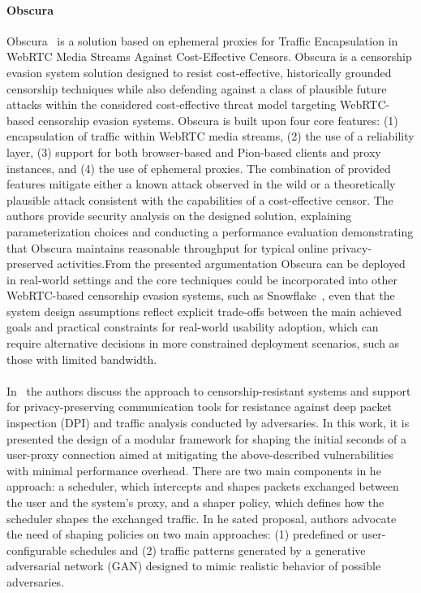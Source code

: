 \paragraph{Obscura} Obscura~\cite{OBSCURA} is a solution based on ephemeral proxies for Traffic Encapsulation in WebRTC Media Streams Against Cost-Effective Censors. Obscura is a censorship evasion system solution designed to resist cost-effective, historically grounded censorship techniques while also defending against a class of plausible future attacks within the considered cost-effective threat model targeting WebRTC-based censorship evasion systems. Obscura is built upon four core features: (1) encapsulation of traffic within WebRTC media streams, (2) the use of a reliability layer, (3) support for both browser-based and Pion-based clients and proxy instances, and (4) the use of ephemeral proxies. The combination of provided features mitigate either a known attack observed in the wild or a theoretically plausible attack consistent with the capabilities of a cost-effective censor. The authors provide security analysis on the designed solution, explaining parameterization choices and conducting a performance evaluation demonstrating that Obscura maintains reasonable throughput for typical online privacy- preserved activities.From the presented argumentation Obscura can be deployed in real-world settings and the core techniques could be incorporated into other WebRTC-based censorship evasion systems, such as Snowflake~\cite{Snowflake}, even that the system design assumptions reflect explicit trade-offs between the main achieved goals and practical constraints for real-world usability adoption, which can require alternative decisions in more constrained deployment scenarios, such as those with limited bandwidth.

\paragraph{} In~\cite{ARTIGO1} the authors discuss the approach to censorship-resistant systems and support for privacy-preserving communication tools for resistance against deep packet inspection (DPI) and traffic analysis conducted by adversaries. In this work, it is presented the design of a modular framework for shaping the initial seconds of a user-proxy connection aimed at mitigating the above-described vulnerabilities with minimal performance overhead. There are two main components in he approach: a scheduler, which intercepts and shapes packets exchanged between the user and the system's proxy, and a shaper policy, which defines how the scheduler shapes the exchanged traffic. In he sated proposal, authors advocate the need of shaping policies on two main approaches: (1) predefined or user-configurable schedules and (2) traffic patterns generated by a generative adversarial network (GAN) designed to mimic realistic behavior of possible adversaries.

